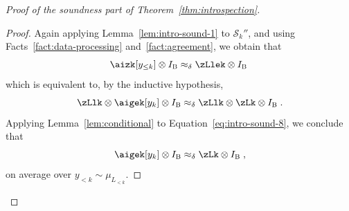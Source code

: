 \documentclass[11pt]{article}
\theoremstyle{definition}
\newcommand{\Id}{\ensuremath{I}}
\newcommand{\ib}{\Id_\bob}
\newcommand{\strategy}{\mathscr{S}}
\newcommand{\labelstyle}[1]{\ensuremath{\textsc{#1}}\xspace}
\newcommand{\bob}{\labelstyle{B}}
\begin{document}
\begin{proof}[Proof of the soundness part of Theorem~\ref{thm:introspection}]
\begin{proof}
    Again applying Lemma~\ref{lem:intro-sound-1} to $\strategy_k''$, and using
    Facts~\ref{fact:data-processing} and~\ref{fact:agreement}, we obtain that
    \begin{equation*}
      \aizk[y_{\le k}] \otimes \ib \approx_\delta \zLlek \otimes \ib\;
    \end{equation*}
    which is equivalent to, by the inductive hypothesis,
    \begin{equation}\label{eq:intro-sound-8}
      \zLlk \otimes \aigek[y_k] \otimes \ib \approx_\delta \zLlk \otimes \zLk
      \otimes \ib\;.
    \end{equation}
    Applying Lemma~\ref{lem:conditional} to Equation~\eqref{eq:intro-sound-8},
    we conclude that
    \begin{equation}\label{eq:consistency-equation}
      \aigek[y_k] \otimes \ib \approx_\delta
      \zLk \otimes \ib\;,
    \end{equation}
    on average over $y_{<k} \sim \mu_{L_{<k}}$.
  

\end{proof}
\end{proof}
\end{document}
